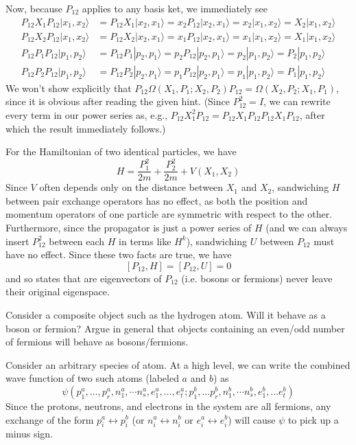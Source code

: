 \documentclass[../principles-of-quantum-mechanics.tex]{subfiles}
\begin{document}
\begin{questions}
\begin{solution}
			Now, because $P_{12}$ applies to any basis ket, we immediately see
			\begin{align*}
				P_{12}X_1P_{12}|x_1, x_2\rangle &= P_{12}X_1|x_2,x_1\rangle = x_2P_{12}|x_2, x_1\rangle = x_2|x_1, x_2\rangle = X_2|x_1, x_2\rangle \\
				P_{12}X_2P_{12}|x_1, x_2\rangle &= P_{12}X_2|x_2,x_1\rangle = x_1P_{12}|x_2, x_1\rangle = x_1|x_1, x_2\rangle = X_1|x_1, x_2\rangle \\
				P_{12}P_1P_{12}|p_1, p_2\rangle &= P_{12}P_1|p_2,p_1\rangle = p_2P_{12}|p_2, p_1\rangle = p_2|p_1, p_2\rangle = P_2|p_1, p_2\rangle \\
				P_{12}P_2P_{12}|p_1, p_2\rangle &= P_{12}P_2|p_2,p_1\rangle = p_1P_{12}|p_2, p_1\rangle = p_1|p_1, p_2\rangle = P_1|p_1, p_2\rangle
			\end{align*}
			We won't show explicitly that $P_{12}\Omega(X_1, P_1; X_2, P_2)P_{12} = \Omega(X_2, P_2; X_1, P_1)$, since it is obvious after reading the given hint. (Since $P_{12}^2 = I$, we can rewrite every term in our power series as, e.g., $P_{12}X_1^2P_{12} = P_{12}X_1P_{12}P_{12}X_1P_{12}$, after which the result immediately follows.)
			
			For the Hamiltonian of two identical particles, we have
			$$H = \frac{P_1^2}{2m} + \frac{P_2^2}{2m} + V(X_1, X_2)$$
			Since $V$ often depends only on the distance between $X_1$ and $X_2$, sandwiching $H$ between pair exchange operators has no effect, as both the position and momentum operators of one particle are symmetric with respect to the other. Furthermore, since the propagator is just a power series of $H$ (and we can always insert $P_{12}^2$ between each $H$ in terms like $H^k$), sandwiching $U$ between $P_{12}$ must have no effect. Since these two facts are true, we have
			$$[P_{12}, H] = [P_{12}, U] = 0$$
			and so states that are eigenvectors of $P_{12}$ (i.e. bosons or fermions) never leave their original eigenspace.
		\end{solution}
		
		\question Consider a composite object such as the hydrogen atom. Will it behave as a boson or fermion? Argue in general that objects containing an even/odd number of fermions will behave as bosons/fermions.
		
		\begin{solution}
			Consider an arbitrary species of atom. At a high level, we can write the combined wave function of two such atoms (labeled $a$ and $b$) as
			$$\psi(p^a_1, \dots, p^a_r, n^a_1,\cdots n^a_s, e^a_1, \dots, e^a_t; p^b_1,\dots p^b_r, n^b_1,\cdots n^b_s, e^b_1, \dots e^b_t)$$
			Since the protons, neutrons, and electrons in the system are all fermions, any exchange of the form $p_i^a \leftrightarrow p^b_i$ (or $n_i^a\leftrightarrow n_i^b$ or $e_i^a\leftrightarrow e_i^b$) will cause $\psi$ to pick up a minus sign.
			

\end{solution}
\end{questions}
\end{document}
